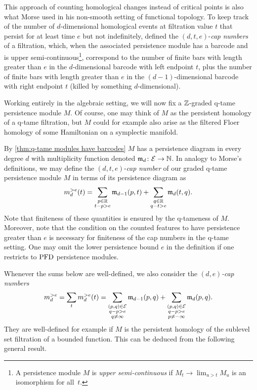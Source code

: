 This approach of counting homological changes instead of critical points is also what Morse used in his non-smooth setting of functional topology.
To keep track of the number of $d$-dimensional homological events at filtration value $t$ that persist for at least time $e$ but not indefinitely, \citet{Morse.1940} defined the $(d, t, e)$-\textit{cap numbers} of a filtration, which, when the associated persistence module has a barcode and is upper semi-continuous\footnote{A persistence module $M$ is \emph{upper semi-continuous} if $M_{t} \to \lim_{u > t} M_{u}$ is an isomorphism for all~$t$.}, correspond to the number of finite bars with length greater than $e$ in the $d$-dimensional barcode with left endpoint $t$, plus the number of finite bars with length greater than $e$ in the $(d-1)$-dimensional barcode with right endpoint $t$ (killed by something $d$-dimensional).

Working entirely in the algebraic setting, we will now fix a $\mathbb{Z}$-graded q-tame persistence module $M$.
Of course, one may think of $M$ as the persistent homology of a q-tame filtration, but $M$ could for example also arise as the filtered Floer homology of some Hamiltonian on a symplectic manifold.

By \cref{thm:q-tame modules have barcodes} $M$ has a persistence diagram in every degree $d$ with multiplicity function denoted $\mathfrak{m}_d \colon \mathcal{E} \to \mathbb{N}$.
In analogy to Morse's definitions, we may define the $(d, t, e)$-\textit{cap number} of our graded q-tame persistence module $M$ in terms of its persistence diagram as
\[
m_{d}^{> e}(t) =
\sum_{\substack{p \in \mathbb{R} \\ t - p > e}} \mathfrak{m}_{d-1}(p, t) +
\sum_{\substack{q \in \mathbb{R} \\ q - t > e}} \mathfrak{m}_d(t, q).
\]
Note that finiteness of these quantities is ensured by the q-tameness of $M$. 
Moreover, note that the condition on the counted features to have persistence greater than $e$ is necessary for finiteness of the cap numbers in the q-tame setting. 
One may omit the lower persistence bound $e$ in the definition if one restricts to $\mathrm{PFD}$ persistence modules.

Whenever the sums below are well-defined, we also consider the \emph{$(d,e)$-cap numbers} 
\[
m_{d}^{> e } 
= \sum_{t} m_{d}^{> e}(t) 
=
\sum_{\substack{(p,q) \in \mathcal{E} \\ q - p > e \\ q \neq \infty}} \mathfrak{m}_{d-1}(p,q)
+
\sum_{\substack{(p,q) \in \mathcal{E} \\ q - p > e \\ p \neq -\infty}}\mathfrak{m}_d(p,q).
\] 
They are well-defined for example if $M$ is the persistent homology of the sublevel set filtration of a bounded function. This can be deduced from the following general result.

